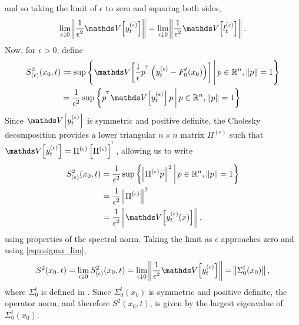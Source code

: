 and so taking the limit of \(\epsilon\) to zero and squaring both sides,
\begin{equation}\label{eqn:sigma_lim}
	\lim_{\epsilon\downarrow 0}\norm{\frac{1}{\epsilon^2}\var{y_t^{(\epsilon)}}} =
	\lim_{\epsilon\downarrow 0}\norm{\frac{1}{\epsilon^2}\var{l_t^{(\epsilon)}}} .
\end{equation}
Now, for \(\epsilon > 0\), define
\begin{align*}
	S^2_{(\epsilon)}(x_0,t) & \coloneqq \sup{\setc{\var{\frac{1}{\epsilon} p^{\T}\left(y_t^{(\epsilon)} - F_0^t\!\left(x_0\right)\right)}}{p \in \R^n, \, \norm{p} = 1}} \\
	                        & = \frac{1}{\epsilon^2}\sup{\setc{p^{\T}\var{y_t^{(\epsilon)}}p}{p \in \R^n, \, \norm{p} = 1}}
\end{align*}
Since \(\var{y_t^{(\epsilon)}}\) is symmetric and positive definite, the Cholesky decomposition provides a lower triangular \(n \times n\) matrix \(\Pi^{(\epsilon)}\) such that \(\var{y_t^{(\epsilon)}} = \Pi^{(\epsilon)}\left[\Pi^{(\epsilon)}\right]^{\T}\), allowing us to write
\begin{align*}
	S^2_{(\epsilon)}(x_0,t) & = \frac{1}{\epsilon^2}\sup\setc{\norm{\Pi^{(\epsilon)}p}^2}{p \in \R^n, \, \norm{p} = 1} \\
	                        & = \frac{1}{\epsilon^2}\norm{\Pi^{(\epsilon)}}^2                                          \\
	                        & = \frac{1}{\epsilon^2}\norm{\var{y_t^{(\epsilon)}(x)}},
\end{align*}
using properties of the spectral norm.
Taking the limit as \(\epsilon\) approaches zero and using \cref{eqn:sigma_lim},
\[
	S^2(x_0,t) = \lim_{\epsilon\downarrow 0} S^2_{(\epsilon)}(x_0,t) = \lim_{\epsilon\downarrow 0}\norm{\frac{1}{\epsilon^2}\var{y_t^{(\epsilon)}}} = \norm{\Sigma_0^t\!\left(x_0\right)},
\]
where \( \Sigma_0^t \) is defined in .
Since \(\Sigma_0^t\!\left(x_0\right)\) is symmetric and positive definite, the operator norm, and therefore \(S^2\!\left(x_0,t\right)\), is given by the largest eigenvalue of \(\Sigma_0^t\!\left(x_0\right)\).
